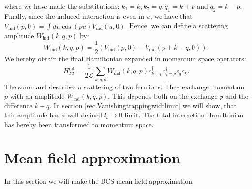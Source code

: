where we have made the substitutions: $k_1 = k, k_2 = q, q_1 = k + p$ and $q_2 = k - p$. Finally, since the induced interaction is even in $u$, we have that $V_{\text{ind}}(p, 0) = \int du \cos(pu) \tilde{V}_{\text{ind}}(u, 0)$. Hence, we can define a scattering amplitude $W_{\text{ind}}(k, q, p)$ by:
\begin{equation}
W_{\text{ind}}(k, q, p) = \frac{1}{2}\left(V_\text{ind}\left( p, 0 \right) - V_\text{ind}\left( p + k - q, 0 \right) \right). 
\label{eq.Wkqp.scattering.amplitude}
\end{equation}
We hereby obtain the final Hamiltonian expanded in momentum space operators:
\begin{equation}
H^\text{int}_{FF} = \frac{1}{2\mathcal{L}} \sum_{k,q,p} W_{\text{ind}}(k, q, p) c^\dagger_{k+p} c^\dagger_{q-p} c_{q} c_{k}. 
\label{eq.HintMomentumSpace}
\end{equation}
The summand describes a scattering of two fermions. They exchange momentum $p$ with an amplitude $W_{\text{ind}}(k, q, p)$. This depends both on the exchange $p$ and the difference $k - q$. In section \ref{sec.Vanishingtrappingwidtlimit} we will show, that this amplitude has a well-defined $l_t \to 0$ limit. The total interaction Hamiltonian has hereby been transformed to momentum space. 

\clearpage

\section{Mean field approximation} \label{sec.meanfieldapproximation}
In this section we will make the BCS mean field approximation. 

